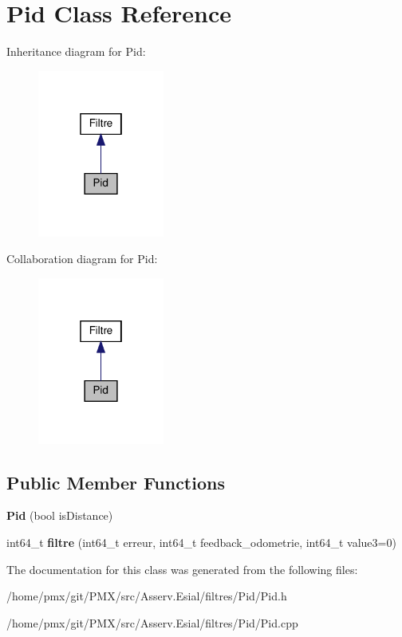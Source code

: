 \hypertarget{classPid}{}\section{Pid Class Reference}
\label{classPid}


Inheritance diagram for Pid\+:
\nopagebreak
\begin{figure}[H]
\begin{center}
\leavevmode
\includegraphics[width=118pt]{classPid__inherit__graph}
\end{center}
\end{figure}


Collaboration diagram for Pid\+:
\nopagebreak
\begin{figure}[H]
\begin{center}
\leavevmode
\includegraphics[width=118pt]{classPid__coll__graph}
\end{center}
\end{figure}
\subsection*{Public Member Functions}
\begin{DoxyCompactItemize}
\item 
\mbox{\label{classPid_ad347a25487b9d0dbbe3ed39d91b9eb9a}} 
{\bfseries Pid} (bool is\+Distance)
\item 
\mbox{\label{classPid_a4a67f78d70f3b313116d6329965c159c}} 
int64\+\_\+t {\bfseries filtre} (int64\+\_\+t erreur, int64\+\_\+t feedback\+\_\+odometrie, int64\+\_\+t value3=0)
\end{DoxyCompactItemize}


The documentation for this class was generated from the following files\+:\begin{DoxyCompactItemize}
\item 
/home/pmx/git/\+P\+M\+X/src/\+Asserv.\+Esial/filtres/\+Pid/Pid.\+h\item 
/home/pmx/git/\+P\+M\+X/src/\+Asserv.\+Esial/filtres/\+Pid/Pid.\+cpp\end{DoxyCompactItemize}
